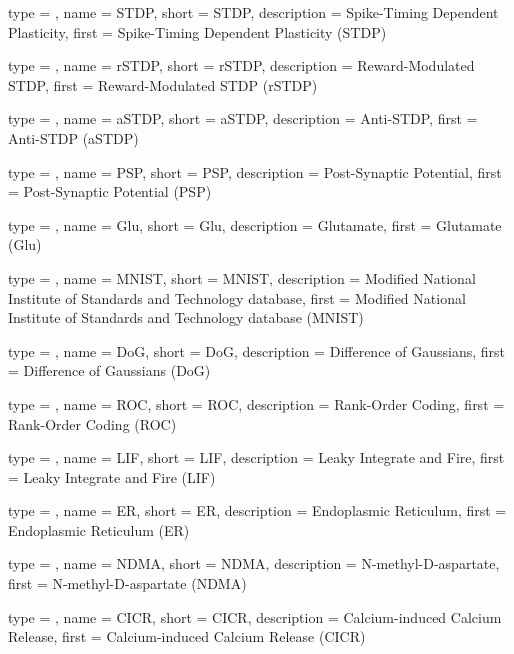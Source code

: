 {
	type        = \acronymtype,
	name        = {STDP},
	short       = {STDP},
	description = {Spike-Timing Dependent Plasticity},
	first       = {Spike-Timing Dependent Plasticity (STDP)}
}

{
	type        = \acronymtype,
	name        = {rSTDP},
	short       = {rSTDP},
	description = {Reward-Modulated STDP},
	first       = {Reward-Modulated STDP (rSTDP)}
}

{
	type        = \acronymtype,
	name        = {aSTDP},
	short       = {aSTDP},
	description = {Anti-STDP},
	first       = {Anti-STDP (aSTDP)}
}

{
	type        = \acronymtype,
	name        = {PSP},
	short       = {PSP},
	description = {Post-Synaptic Potential},
	first       = {Post-Synaptic Potential (PSP)}
}

{
	type        = \acronymtype,
	name        = {Glu},
	short       = {Glu},
	description = {Glutamate},
	first       = {Glutamate (Glu)}
}

{
	type        = \acronymtype,
	name        = {MNIST},
	short       = {MNIST},
	description = {Modified National Institute of Standards and Technology database},
	first       = {Modified National Institute of Standards and Technology database (MNIST)}
}

{
	type        = \acronymtype,
	name        = {DoG},
	short       = {DoG},
	description = {Difference of Gaussians},
	first       = {Difference of Gaussians (DoG)}
}

{
	type        = \acronymtype,
	name        = {ROC},
	short       = {ROC},
	description = {Rank-Order Coding},
	first       = {Rank-Order Coding (ROC)}
}

{
	type        = \acronymtype,
	name        = {LIF},
	short       = {LIF},
	description = {Leaky Integrate and Fire},
	first       = {Leaky Integrate and Fire (LIF)}
}

{
	type        = \acronymtype,
	name        = {ER},
	short       = {ER},
	description = {Endoplasmic Reticulum},
	first       = {Endoplasmic Reticulum (ER)}
}

{
	type        = \acronymtype,
	name        = {NDMA},
	short       = {NDMA},
	description = {N-methyl-D-aspartate},
	first       = {N-methyl-D-aspartate (NDMA)}
}

{
	type        = \acronymtype,
	name        = {CICR},
	short       = {CICR},
	description = {Calcium-induced Calcium Release},
	first       = {Calcium-induced Calcium Release (CICR)}
}

